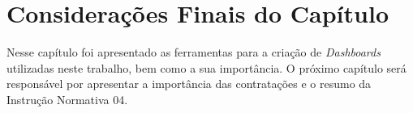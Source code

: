 \section{Considerações Finais do Capítulo}

Nesse capítulo foi apresentado as ferramentas para a criação de \textit{Dashboards} utilizadas neste trabalho, bem como a sua importância. O próximo capítulo será responsável por apresentar a importância das contratações e o resumo da Instrução Normativa 04.

